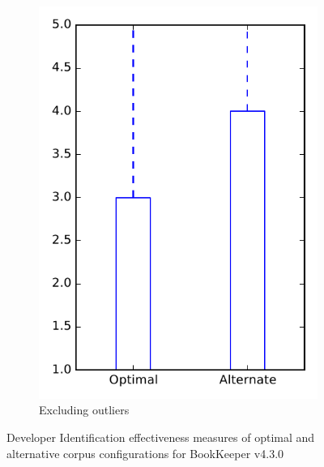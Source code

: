 \begin{figure}
\begin{subfigure}{.4\textwidth}
        \includegraphics[height=0.4\textheight]{figures/combo/dit_rq2_bookkeeper_no_outlier}
        \caption{Excluding outliers}\label{fig:combo:dit:rq2:bookkeeper_no_outlier}
    \end{subfigure}
\caption{Developer Identification effectiveness measures of optimal and alternative corpus configurations for BookKeeper v4.3.0}
\label{fig:combo:dit:rq2:bookkeeper}
\end{figure}
